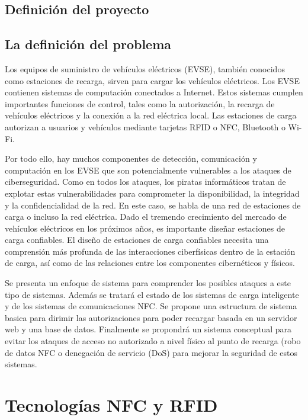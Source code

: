 \documentclass[12pt,a4paper,onecolumn,oneside]{report}
\begin{document}
\section{Definición del proyecto}



\section{La definición del problema}

Los equipos de suministro de vehículos eléctricos (EVSE), también conocidos como estaciones de recarga, sirven para cargar los vehículos eléctricos. Los EVSE contienen sistemas de computación conectados a Internet. Estos sistemas cumplen importantes funciones de control, tales como la autorización, la recarga de vehículos eléctricos y la conexión a la red eléctrica local. Las estaciones de carga autorizan a usuarios y vehículos mediante tarjetas RFID o NFC, Bluetooth o Wi-Fi.

Por todo ello, hay muchos componentes de detección, comunicación y computación en los EVSE que son potencialmente vulnerables a los ataques de ciberseguridad. Como en todos los ataques, los piratas informáticos tratan de explotar estas vulnerabilidades para comprometer la disponibilidad, la integridad y la confidencialidad de la red. En este caso, se habla de una red de estaciones de carga o incluso la red eléctrica. Dado el tremendo crecimiento del mercado de vehículos eléctricos en los próximos años, es importante diseñar estaciones de carga confiables. El diseño de estaciones de carga confiables necesita una comprensión más profunda de las interacciones ciberfísicas dentro de la estación de carga, así como de las relaciones entre los componentes cibernéticos y físicos. 

Se presenta un enfoque de sistema para comprender los posibles ataques a este tipo de sistemas. Además se tratará el estado de los sistemas de carga inteligente y de los sistemas de comunicaciones NFC. Se propone una estructura de sistema basica para dirimir las autorizaciones para poder recargar basada en un servidor web y una base de datos. Finalmente se propondrá un sistema conceptual para evitar los ataques de acceso no autorizado a nivel físico al punto de recarga (robo de datos NFC o denegación de servicio (DoS) para mejorar la seguridad de estos sistemas.




\chapter{Tecnologías NFC y RFID}
\label{Tecnologías NFC y RFID}
\end{document}
